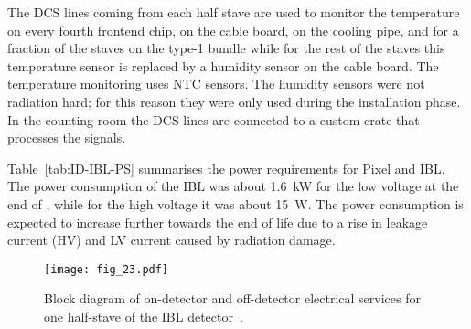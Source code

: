 \documentclass[cernpreprint, atlasdraft=false, UKenglish,british,orcidlogo, texmf, orcidlogo]{atlasdoc}
\begin{document}
The \gls{DCS} lines coming from each half stave are used to monitor the temperature on every fourth frontend chip, on the cable board,
on the cooling pipe, and for a fraction of the staves on the type-1 bundle while for the rest of the staves this temperature sensor is replaced by a humidity sensor on the cable board.
The temperature monitoring uses \gls{NTC} sensors. The humidity sensors were not radiation hard; for this reason they were only used during the installation phase.
In the counting room the \gls{DCS} lines are connected to a custom crate that processes the signals.
 
Table~\ref{tab:ID-IBL-PS} summarises the power requirements for Pixel and \gls{IBL}. The power consumption of the \gls{IBL} was about \SI{1.6}{\kW} for the low voltage at the end of \RunTwo,  while for the high voltage it was about \SI{15}{\W}. The power consumption is expected to increase further towards the end of life due to a rise in leakage current (\gls{HV}) and \gls{LV} current caused by radiation damage.
 
\begin{figure}
\centering
\texttt{[image: fig\_23.pdf]}
\caption{Block diagram of on-detector and off-detector electrical services for one half-stave of the IBL detector~\cite{PIX-2018-001}.
}
\label{fig:IBL_Services}
\end{figure}
 
\end{document}
